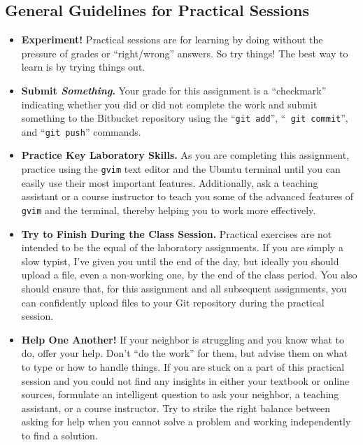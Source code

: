\subsection*{General Guidelines for Practical Sessions}
\vspace*{-.05in}
\begin{itemize}

\item {\bf Experiment!} Practical sessions are for learning by doing without the pressure of grades or ``right/wrong''
  answers. So try things!  The best way to learn is by trying things out.

\item {\bf Submit \textbf{\textit{Something}}.} Your grade for this assignment is a ``checkmark'' indicating whether you
  did or did not complete the work and submit something to the Bitbucket repository using the ``{\tt git add}'', ``{\tt
    git commit}'', and ``{\tt git push}'' commands.

\item {\bf Practice Key Laboratory Skills.} As you are completing this assignment, practice using the {\tt gvim} text
  editor and the Ubuntu terminal until you can easily use their most important features.  Additionally, ask
  a teaching assistant or a course instructor to teach you some of the advanced features of {\tt gvim} and the
  terminal, thereby helping you to work more effectively. 

\item {\bf Try to Finish During the Class Session.} Practical exercises are not intended to be the equal of the
  laboratory assignments. If you are simply a slow typist, I've given you until the end of the day, but ideally you
  should upload a file, even a non-working one, by the end of the class period. You also should ensure that, for this
  assignment and all subsequent assignments, you can confidently upload files to your Git repository during the
  practical session.

\item {\bf Help One Another!} If your neighbor is struggling and you know what to do, offer your help. Don't ``do the
  work'' for them, but advise them on what to type or how to handle things. If you are stuck on a part of this practical
  session and you could not find any insights in either your textbook or online sources, formulate an intelligent
  question to ask your neighbor, a teaching assistant, or a course instructor. Try to strike the right balance between
  asking for help when you cannot solve a problem and working independently to find a solution.


\end{itemize}
